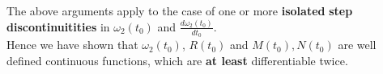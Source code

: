 \documentclass[11pt]{elsarticle}
\begin{document}


The above arguments apply to the case of one or more \textbf{isolated }\textbf{step discontinuitities} in $\omega_2(t_0)$ and $\frac{d\omega_2(t_0)}{dt_0}$.\\

Hence we have shown that $\omega_2(t_0)$, $R(t_0)$ and $M(t_0), N(t_0)$ are well defined continuous functions, which are \textbf{at least} differentiable twice.\\



\end{document}
